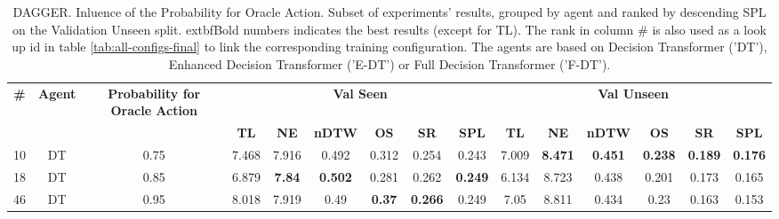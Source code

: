 \begin{table}
\centering
\caption{\label{tab:dagger_prob}DAGGER. Inluence of the Probability for Oracle Action. Subset of experiments' results, grouped by agent and ranked by descending SPL on the Validation Unseen split. 	extbf{Bold} numbers indicates the best results (except for TL). The rank in column \# is also used as a look up id in table \ref{tab:all-configs-final} to link the corresponding training configuration.     \newline The agents are based on Decision Transformer ('DT'), Enhanced Decision Transformer ('E-DT') or Full Decision Transformer ('F-DT').}
\begin{tabular}{@{\hskip3pt}c@{\hskip3pt}c@{\hskip3pt}c@{\hskip3pt}c@{\hskip3pt}c@{\hskip3pt}c@{\hskip3pt}c@{\hskip3pt}c@{\hskip3pt}c@{\hskip3pt}c@{\hskip3pt}c@{\hskip3pt}c@{\hskip3pt}c@{\hskip3pt}c@{\hskip3pt}c}
\toprule
\textbf{\#} & \textbf{Agent} & \textbf{Probability for Oracle Action} & \multicolumn{6}{c}{\textbf{Val Seen}} & \multicolumn{6}{c}{\textbf{Val Unseen}} \\
 \textbf{~} &     \textbf{~} &                             \textbf{~} &       \textbf{TL} &    \textbf{NE} &   \textbf{nDTW} &    \textbf{OS} &     \textbf{SR} &    \textbf{SPL} &         \textbf{TL} &     \textbf{NE} &   \textbf{nDTW} &     \textbf{OS} &     \textbf{SR} &    \textbf{SPL} \\
\midrule
         10 &             DT &                                   0.75 &             7.468 &          7.916 &           0.492 &          0.312 &           0.254 &           0.243 &               7.009 &  \textbf{8.471} &  \textbf{0.451} &  \textbf{0.238} &  \textbf{0.189} &  \textbf{0.176} \\
         18 &             DT &                                   0.85 &             6.879 &  \textbf{7.84} &  \textbf{0.502} &          0.281 &           0.262 &  \textbf{0.249} &               6.134 &           8.723 &           0.438 &           0.201 &           0.173 &           0.165 \\
         46 &             DT &                                   0.95 &             8.018 &          7.919 &            0.49 &  \textbf{0.37} &  \textbf{0.266} &           0.249 &                7.05 &           8.811 &           0.434 &            0.23 &           0.163 &           0.153 \\
\bottomrule
\end{tabular}
\end{table}

